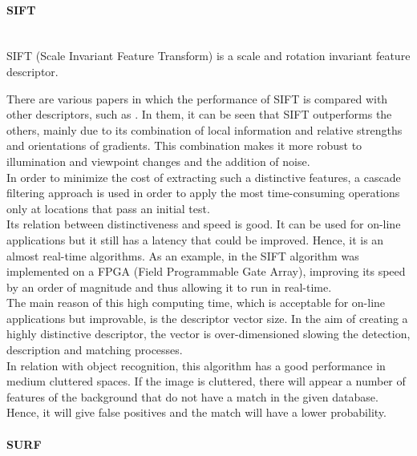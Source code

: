 \paragraph{SIFT}\mbox{}\\

SIFT (Scale Invariant Feature Transform) is a scale and rotation invariant feature descriptor\cite{sift}. 

There are various papers in which the performance of SIFT is compared with other descriptors, such as \cite{Mikolajczyk2005}. In them, it can be seen that SIFT outperforms the others, mainly due to its combination of local information and relative strengths and orientations of gradients. This combination makes it more robust to illumination and viewpoint changes and the addition of noise. 
\\

In order to minimize the cost of extracting such a distinctive features, a cascade filtering approach is used in order to apply the most time-consuming operations only at locations that pass an initial test. 
\\

Its relation between distinctiveness and speed is good. It can be used for on-line applications but it still has a latency that could be improved. Hence, it is an almost real-time algorithms. As an example, in \cite{sift_fpga} the SIFT algorithm was implemented on a FPGA (Field Programmable Gate Array), improving its speed by an order of magnitude and thus allowing it to run in real-time.
\\

The main reason of this high computing time, which is acceptable for on-line applications but improvable, is the descriptor vector size. In the aim of creating a highly distinctive descriptor, the vector is over-dimensioned slowing the detection, description and matching processes. 
\\

In relation with object recognition, this algorithm has a good performance in medium cluttered spaces. If the image is cluttered, there will appear a number of features of the background that do not have a match in the given database. Hence, it will give false positives and the match will have a lower probability. 




\paragraph{SURF}\mbox{}\\


